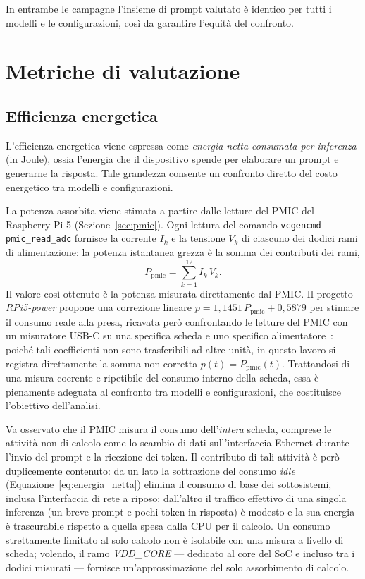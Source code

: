 In entrambe le campagne l'insieme di prompt valutato è identico per tutti i
modelli e le configurazioni, così da garantire l'equità del confronto.

\section{Metriche di valutazione}

\subsection{Efficienza energetica}

L'efficienza energetica viene espressa come \textit{energia netta consumata per
inferenza} (in Joule), ossia l'energia che il dispositivo spende per elaborare un
prompt e generarne la risposta. Tale grandezza consente un confronto diretto del
costo energetico tra modelli e configurazioni.

La potenza assorbita viene stimata a partire dalle letture del PMIC del Raspberry
Pi 5 (Sezione~\ref{sec:pmic}). Ogni lettura del comando
\texttt{vcgencmd pmic\_read\_adc} fornisce la corrente $I_k$ e la tensione $V_k$
di ciascuno dei dodici rami di alimentazione: la potenza istantanea grezza è la
somma dei contributi dei rami,
\begin{equation}
    P_{\text{pmic}} = \sum_{k=1}^{12} I_k \, V_k .
    \label{eq:pmic_somma}
\end{equation}
Il valore così ottenuto è la potenza misurata direttamente dal PMIC. Il progetto
\textit{RPi5-power} propone una correzione lineare
$p = 1{,}1451\,P_{\text{pmic}} + 0{,}5879$ per stimare il consumo reale alla
presa, ricavata però confrontando le letture del PMIC con un misuratore USB-C su
una specifica scheda e uno specifico alimentatore~\cite{jfikar_rpi5power}: poiché
tali coefficienti non sono trasferibili ad altre unità, in questo lavoro si
registra direttamente la somma non corretta $p(t) = P_{\text{pmic}}(t)$.
Trattandosi di una misura coerente e ripetibile del consumo interno della scheda,
essa è pienamente adeguata al confronto tra modelli e configurazioni, che
costituisce l'obiettivo dell'analisi.

Va osservato che il PMIC misura il consumo dell'\emph{intera} scheda, comprese le
attività non di calcolo come lo scambio di dati sull'interfaccia Ethernet durante
l'invio del prompt e la ricezione dei token. Il contributo di tali attività è però
duplicemente contenuto: da un lato la sottrazione del consumo \textit{idle}
(Equazione~\ref{eq:energia_netta}) elimina il consumo di base dei sottosistemi,
inclusa l'interfaccia di rete a riposo; dall'altro il traffico effettivo di una
singola inferenza (un breve prompt e pochi token in risposta) è modesto e la sua
energia è trascurabile rispetto a quella spesa dalla CPU per il calcolo. Un consumo
strettamente limitato al solo calcolo non è isolabile con una misura a livello di
scheda; volendo, il ramo \textit{VDD\_CORE} — dedicato al core del SoC e incluso tra
i dodici misurati — fornisce un'approssimazione del solo assorbimento di calcolo.

